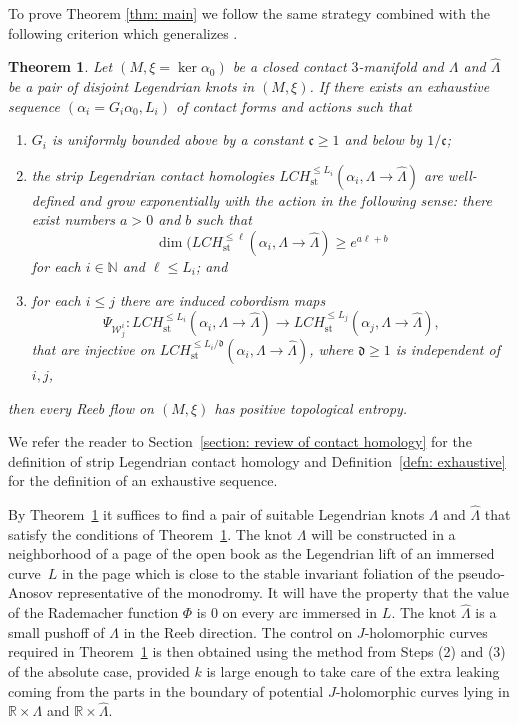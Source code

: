 \documentclass[10pt]{amsart}
\let\mathcal\mathscr
\let\ra\rightarrow
\newcommand{\st}{\mathrm{st}}
\theoremstyle{plain}
\newtheorem{thm}{Theorem}[section]
\theoremstyle{definition}
\numberwithin{equation}{subsection}
\newcommand{\RR}{\mathbb{R}}
\newcommand{\NN}{\mathbb{N}}
\newcommand{\be}{\begin{enumerate}}
\newcommand{\ee}{\end{enumerate}}
\begin{document}
To prove Theorem \ref{thm: main} we follow the same strategy combined with the following criterion which generalizes \cite[Th.\,1]{Al}.

\begin{thm}\label{thm:criterion}
Let $(M,\xi =\ker \alpha_0)$ be a closed contact $3$-manifold and $\Lambda$ and $\widehat{\Lambda}$ be a pair of disjoint Legendrian knots in $(M,\xi)$. If there exists an exhaustive sequence $(\alpha_i=G_i\alpha_0,L_i)$ of contact forms and actions such that
\be
\item\label{thm:criterion1} $G_i$ is uniformly bounded above by a constant ${\mathfrak c}\geq 1$ and below by ${1/{\mathfrak c}}$;
\item\label{thm:criterion2} the strip Legendrian contact homologies $LCH_{\st}^{\leq L_i}(\alpha_i, \Lambda\ra\widehat{\Lambda})$ are well-defined and grow exponentially with the action in the following sense: there exist numbers $a>0$ and $b$ such that
$$\dim(LCH_{\st}^{\leq \ell}(\alpha_i,\Lambda\ra\widehat{\Lambda})\geq e^{a\ell +b}$$
for each $i\in\NN$ and $\ell\leq L_i$; and
\item\label{thm:criterion3} for each $i\leq j$ there are induced cobordism maps
$$\Psi_{\mathcal{W}^i_j}: LCH_{\st}^{\leq L_i}(\alpha_i, \Lambda\ra\widehat{\Lambda})\to LCH_{\st}^{\leq L_j}(\alpha_j, \Lambda\ra\widehat{\Lambda}),$$
that are injective on $LCH_{\st}^{\leq L_i/{\mathfrak d}}(\alpha_i, \Lambda\ra\widehat{\Lambda})$, where ${\mathfrak d}\geq 1$ is independent of $i,j$,
\ee
then every Reeb flow on $(M,\xi)$ has positive topological entropy.
\end{thm}

We refer the reader to Section~\ref{section: review of contact homology} for the definition of strip Legendrian contact homology and Definition~\ref{defn: exhaustive} for the definition of an exhaustive sequence.

By Theorem~\ref{thm:criterion} it suffices to find a pair of suitable Legendrian knots $\Lambda$ and $\widehat{\Lambda}$ that satisfy the conditions of Theorem~\ref{thm:criterion}. The knot $\Lambda$ will be constructed in a neighborhood of a page of the open book as the Legendrian lift of an immersed curve~$L$ in the page which is close to the stable invariant foliation of the pseudo-Anosov representative of the monodromy. It will have the property that the value of the Rademacher function $\Phi$ is $0$ on every arc immersed in $L$. The knot $\widehat{\Lambda}$ is a small pushoff of $\Lambda$ in the Reeb direction. The control on $J$-holomorphic curves required in Theorem~\ref{thm:criterion} is then obtained using the method from Steps (2) and (3) of the absolute case, provided $k$ is large enough to take care of the extra leaking coming from the parts in the boundary of potential $J$-holomorphic curves lying in $\RR\times\Lambda$ and $\RR\times \widehat{\Lambda}$.
\end{document}

